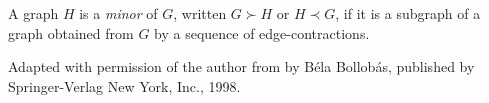 \documentclass[12pt]{article}
\begin{document}
A graph $H$ is a \emph{minor} of $G$, written $G \succ H$ or $H \prec G$, if it is a subgraph of a graph obtained from $G$ by a sequence of edge-contractions.


\footnotesize{Adapted with permission of the author from \emph{} by B\'{e}la Bollob\'{a}s, published by Springer-Verlag New York, Inc., 1998.}
\end{document}
